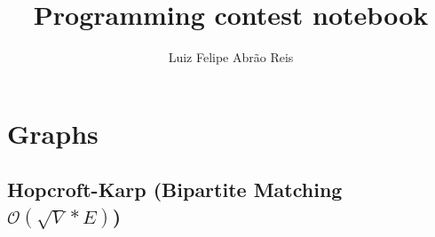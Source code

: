 \documentclass[10pt, a4paper, twoside, notitlepage]{article}
\title{Programming contest notebook}
\author{Luiz Felipe Abrão Reis}
\date{ }
\begin{document}
\begin{titlepage}
\maketitle
\tableofcontents
\end{titlepage}


%
%
%

\section{Graphs}

\subsection{Hopcroft-Karp (Bipartite Matching $\mathcal{O}(\sqrt{V}*E)$)}


\end{document}
